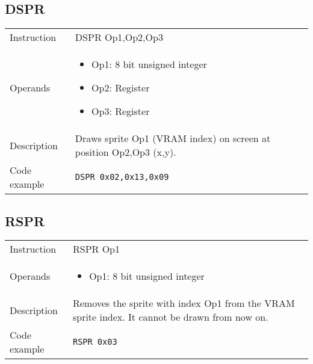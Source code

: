 \subsection{DSPR}
\renewcommand*{\arraystretch}{2.0}
\begin{longtable}{P{3cm}P{9cm}}
\midrule
\noindent Instruction & DSPR Op1,Op2,Op3 \\
\noindent Operands &
\begin{itemize}[label={},noitemsep,leftmargin=*,topsep=0pt,partopsep=0pt, itemsep=1em]
\item Op1: 8 bit unsigned integer
\item Op2: Register
\item Op3: Register
\end{itemize}\\
\noindent Description & Draws sprite Op1 (VRAM index) on screen at position Op2,Op3 (x,y). \\
\noindent Code example & 
\begin{lstlisting}
DSPR 0x02,0x13,0x09
\end{lstlisting} \\
\end{longtable}

\newpage

\subsection{RSPR}
\renewcommand*{\arraystretch}{2.0}
\begin{longtable}{P{3cm}P{9cm}}
\midrule
\noindent Instruction & RSPR Op1 \\
\noindent Operands &
\begin{itemize}[label={},noitemsep,leftmargin=*,topsep=0pt,partopsep=0pt, itemsep=1em]
\item Op1: 8 bit unsigned integer
\end{itemize}\\
\noindent Description & Removes the sprite with index Op1 from the VRAM sprite index. It cannot be drawn from now on. \\
\noindent Code example & 
\begin{lstlisting}
RSPR 0x03
\end{lstlisting} \\
\end{longtable}


